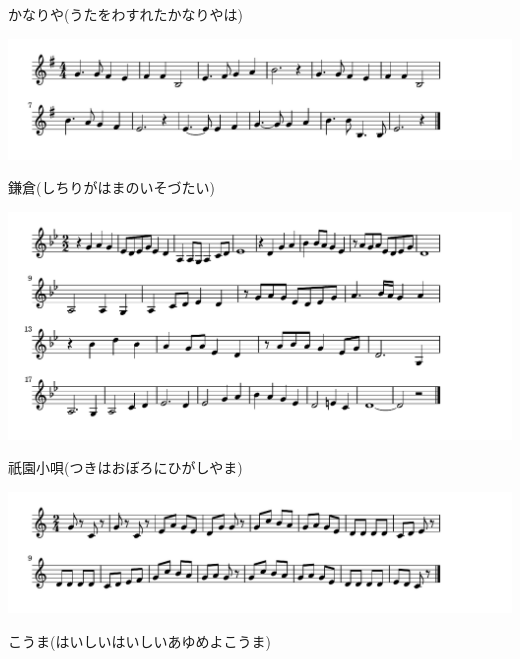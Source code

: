\documentclass[a4paper]{ltjsarticle}
\begin{document}
\vspace{-10mm} \hspace{10mm}
かなりや(うたをわすれたかなりやは)

\includegraphics[clip]{kamakura_crop.pdf}

\vspace{-10mm} \hspace{10mm}
鎌倉(しちりがはまのいそづたい)

\includegraphics[clip]{gionkouta_crop.pdf}

\vspace{-10mm} \hspace{10mm}
祇園小唄(つきはおぼろにひがしやま)

\includegraphics[clip]{kouma_crop.pdf}

\vspace{-10mm} \hspace{10mm}
こうま(はいしいはいしいあゆめよこうま)
\end{document}
